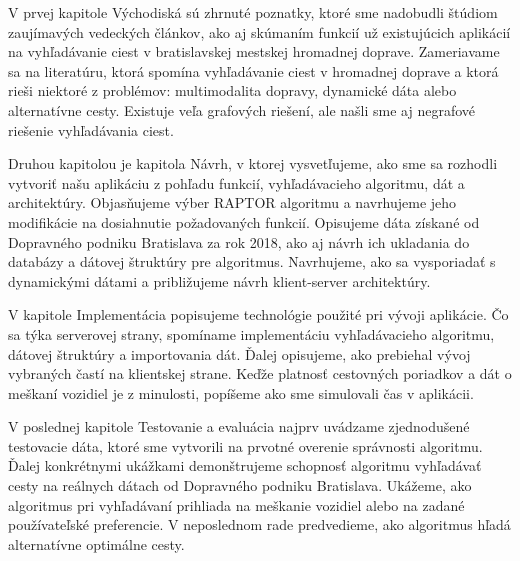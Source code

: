 V prvej kapitole Východiská sú zhrnuté poznatky, ktoré sme nadobudli štúdiom zaujímavých vedeckých článkov, ako aj skúmaním funkcií už existujúcich aplikácií na vyhľadávanie ciest v bratislavskej mestskej hromadnej doprave. Zameriavame sa na literatúru, ktorá spomína vyhľadávanie ciest v hromadnej doprave a ktorá rieši niektoré z problémov: multimodalita dopravy, dynamické dáta alebo alternatívne cesty. Existuje veľa grafových riešení, ale našli sme aj negrafové riešenie vyhľadávania ciest. 

Druhou kapitolou je kapitola Návrh, v ktorej vysvetľujeme, ako sme sa rozhodli vytvoriť našu aplikáciu z pohľadu funkcií, vyhľadávacieho algoritmu, dát a architektúry. Objasňujeme výber RAPTOR algoritmu a navrhujeme jeho modifikácie na dosiahnutie požadovaných funkcií. Opisujeme dáta získané od Dopravného podniku Bratislava za rok 2018, ako aj návrh ich ukladania do databázy a dátovej štruktúry pre algoritmus. Navrhujeme, ako sa vysporiadať s dynamickými dátami a približujeme návrh klient-server architektúry.

V kapitole Implementácia popisujeme technológie použité pri vývoji aplikácie. Čo sa týka serverovej strany, spomíname implementáciu vyhľadávacieho algoritmu, dátovej štruktúry a importovania dát. Ďalej opisujeme, ako prebiehal vývoj vybraných častí na klientskej strane. Keďže platnosť cestovných poriadkov a dát o meškaní vozidiel je z minulosti, popíšeme ako sme simulovali čas v aplikácii. 

V poslednej kapitole Testovanie a evaluácia najprv uvádzame zjednodušené testovacie dáta, ktoré sme vytvorili na prvotné overenie správnosti algoritmu. Ďalej konkrétnymi ukážkami demonštrujeme schopnosť algoritmu vyhľadávať cesty na reálnych dátach od Dopravného podniku Bratislava. Ukážeme, ako algoritmus pri vyhľadávaní prihliada na meškanie vozidiel alebo na zadané používateľské preferencie. V neposlednom rade predvedieme, ako algoritmus hľadá alternatívne optimálne cesty. 


